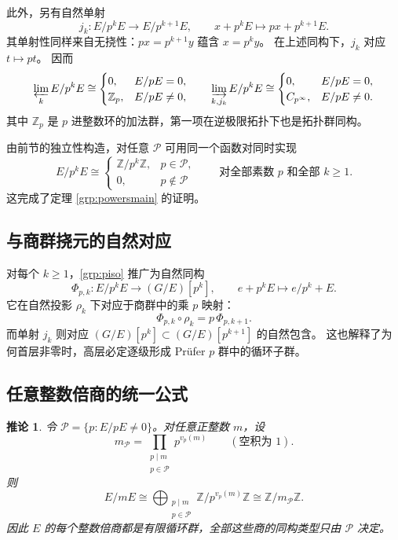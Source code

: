 \documentclass[11pt,a4paper,oneside,openany]{book}
\theoremstyle{lecture}
\newtheorem{corollary}[theorem]{推论}
\newcommand{\Z}{\mathbb Z}
\numberwithin{equation}{section}
\begin{document}
此外，另有自然单射
\[
 j_k:E/p^kE\longrightarrow E/p^{k+1}E,\qquad
 x+p^kE\longmapsto px+p^{k+1}E.
\]
其单射性同样来自无挠性：$px=p^{k+1}y$ 蕴含 $x=p^ky$。
在上述同构下，$j_k$ 对应 $t\mapsto pt$。
因而
\begin{equation}\label{grp:padiclimit}
 \varprojlim_k E/p^kE\cong
 \begin{cases}
 0,&E/pE=0,\\
 \Z_p,&E/pE\ne0,
 \end{cases}
 \qquad
 \varinjlim_{k,j_k} E/p^kE\cong
 \begin{cases}
 0,&E/pE=0,\\
 C_{p^\infty},&E/pE\ne0.
 \end{cases}
\end{equation}
其中 $\Z_p$ 是 $p$ 进整数环的加法群，第一项在逆极限拓扑下也是拓扑群同构。

由前节的独立性构造，对任意 $\mathcal P$ 可用同一个函数对同时实现
\[
 E/p^kE\cong
 \begin{cases}
 \Z/p^k\Z,&p\in\mathcal P,\\
 0,&p\notin\mathcal P
 \end{cases}
 \qquad\text{对全部素数 }p\text{ 和全部 }k\ge1.
\]
这完成了定理 \ref{grp:powersmain} 的证明。

\subsection{与商群挠元的自然对应}

对每个 $k\ge1$，\eqref{grp:piso} 推广为自然同构
\[
 \Phi_{p,k}:E/p^kE\longrightarrow(G/E)[p^k],\qquad
 e+p^kE\longmapsto e/p^k+E.
\]
它在自然投影 $\rho_k$ 下对应于商群中的乘 $p$ 映射：
\[
 \Phi_{p,k}\circ\rho_k=p\,\Phi_{p,k+1}.
\]
而单射 $j_k$ 则对应
$(G/E)[p^k]\subset(G/E)[p^{k+1}]$ 的自然包含。
这也解释了为何首层非零时，高层必定逐级形成 Prüfer $p$ 群中的循环子群。

\subsection{任意整数倍商的统一公式}

\begin{corollary}\label{grp:integerquotients}
令 $\mathcal P=\{p:E/pE\ne0\}$。对任意正整数 $m$，设
\[
 m_{\mathcal P}=\prod_{\substack{p\mid m\\p\in\mathcal P}}p^{v_p(m)}
 \qquad(\text{空积为 }1).
\]
则
\begin{equation}\label{grp:integerclass}
 E/mE\cong\bigoplus_{\substack{p\mid m\\p\in\mathcal P}}
 \Z/p^{v_p(m)}\Z\cong\Z/m_{\mathcal P}\Z.
\end{equation}
因此 $E$ 的每个整数倍商都是有限循环群，全部这些商的同构类型只由
$\mathcal P$ 决定。
\end{corollary}
\end{document}
